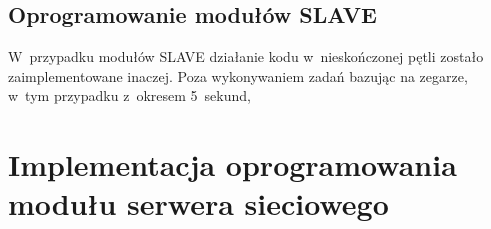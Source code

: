

\FloatBarrier
\subsection{Oprogramowanie modułów SLAVE\label{sect:firmware-slave}} W~przypadku modułów SLAVE działanie kodu
w~nieskończonej pętli zostało zaimplementowane inaczej. Poza wykonywaniem zadań bazując na zegarze, w~tym przypadku
z~okresem 5~sekund,

\FloatBarrier
\section{Implementacja oprogramowania modułu serwera sieciowego\label{sect:firmware-webserver}}